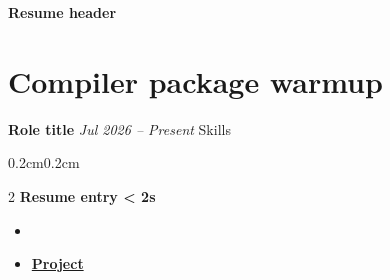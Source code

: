 \documentclass[letterpaper,10pt]{article}
\begin{document}
{\fontsize{26pt}{26pt}\selectfont\textbf{Resume header}}
\section{Compiler package warmup}
\textbf{Role title} \textit{Jul 2026 -- Present} \textbar{} Skills
\renewcommand\labelitemi{$\circ$}
\begin{adjustwidth}{0.2cm}{0.2cm}
  \setcolumnwidth{\fill,4cm}
  \begin{paracol}{2}
    \textbf{Resume entry \textless{} 2s}
    \switchcolumn{}
  \end{paracol}
\end{adjustwidth}
\begin{itemize}[leftmargin=*]
  \item {} \faGithub
  \item \textbf{\href{https://example.invalid}{Project}\raisebox{.15ex}{\footnotesize\faExternalLink*}}
\end{itemize}
\end{document}
